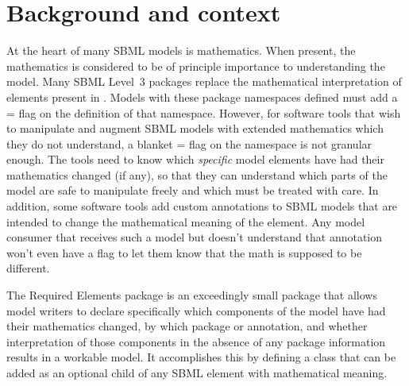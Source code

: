 
\section{Background and context}
\label{background}

At the heart of many SBML models is mathematics. When present, the mathematics is considered to be of principle importance to understanding the model. Many SBML Level~3 packages replace the mathematical interpretation of elements present in \sbmlthreecore.  Models with these package namespaces defined must add a = flag on the definition of that namespace.  However, for software tools that wish to manipulate and augment SBML models with extended mathematics which they do not understand, a blanket = flag on the namespace is not granular enough.  The tools need to know which \emph{specific} model elements have had their mathematics changed (if any), so that they can understand which parts of the model are safe to manipulate freely and which must be treated with care.  In addition, some software tools add custom annotations to SBML models that are intended to change the mathematical meaning of the element.  Any model consumer that receives such a model but doesn't understand that annotation won't even have a  flag to let them know that the math is supposed to be different.

The Required Elements package is an exceedingly small package that allows model writers to declare specifically which components of the model have had their mathematics changed, by which package or annotation, and whether interpretation of those components in the absence of any package information results in a workable model.  It accomplishes this by defining a class that can be added as an optional child of any SBML element with mathematical meaning.
